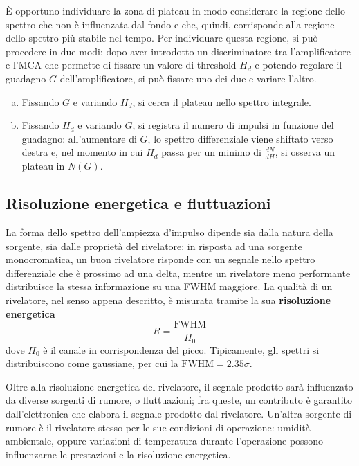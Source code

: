 \documentclass[11pt, a4paper]{scrartcl}
\theoremstyle{style}
\numberwithin{equation}{subsection}
\begin{document}
\`E opportuno individuare la zona di plateau in modo considerare la regione dello spettro che non \`e influenzata dal fondo e che, quindi, corrisponde alla regione dello spettro pi\`u stabile nel tempo.
Per individuare questa regione, si pu\`o procedere in due modi; dopo aver introdotto un discriminatore tra l'amplificatore e l'MCA che permette di fissare un valore di threshold $H_d$ e potendo regolare il guadagno $G$ dell'amplificatore, si pu\`o fissare uno dei due e variare l'altro.
\begin{enumerate}[(a).]
	\item Fissando $G$ e variando $H_d$, si cerca il plateau nello spettro integrale.
	\item Fissando $H_d$ e variando $G$, si registra il numero di impulsi in funzione del guadagno: all'aumentare di $G$, lo spettro differenziale viene shiftato verso destra e, nel momento in cui $H_d$ passa per un minimo di $\frac{d N}{d H} $, si osserva un plateau in $N(G)$.
\end{enumerate}


\subsection{Risoluzione energetica e fluttuazioni}


La forma dello spettro dell'ampiezza d'impulso dipende sia dalla natura della sorgente, sia dalle propriet\`a del rivelatore: in risposta ad una sorgente monocromatica, un buon rivelatore risponde con un segnale nello spettro differenziale che \`e prossimo ad una delta, mentre un rivelatore meno performante distribuisce la stessa informazione su una FWHM maggiore.
La qualit\`a di un rivelatore, nel senso appena descritto, \`e misurata tramite la sua \textbf{risoluzione energetica} 
\begin{equation}
	R = \frac{\text{FWHM}}{H_0}
\end{equation}
dove $H_0$ \`e il canale in corrispondenza del picco.
Tipicamente, gli spettri si distribuiscono come gaussiane, per cui la $\text{FWHM} = 2.35\sigma $.

Oltre alla risoluzione energetica del rivelatore, il segnale prodotto sar\`a influenzato da diverse sorgenti di rumore, o fluttuazioni; fra queste, un contributo \`e garantito dall'elettronica che elabora il segnale prodotto dal rivelatore.
Un'altra sorgente di rumore \`e il rivelatore stesso per le sue condizioni di operazione: umidit\`a ambientale, oppure variazioni di temperatura durante l'operazione possono influenzarne le prestazioni e la risoluzione energetica.
\end{document}
